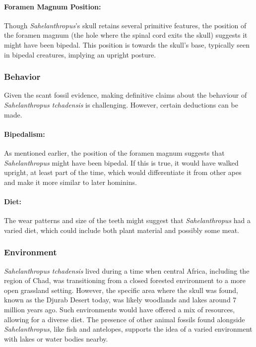 \paragraph{Foramen Magnum Position:} Though \textit{Sahelanthropus}'s skull retains several primitive features, the position of the foramen magnum (the hole where the spinal cord exits the skull) suggests it might have been bipedal. This position is towards the skull's base, typically seen in bipedal creatures, implying an upright posture.

\subsubsection*{Behavior}
Given the scant fossil evidence, making definitive claims about the behaviour of \textit{Sahelanthropus tchadensis} is challenging. However, certain deductions can be made.

\paragraph{Bipedalism:} As mentioned earlier, the position of the foramen magnum suggests that \textit{Sahelanthropus} might have been bipedal. If this is true, it would have walked upright, at least part of the time, which would differentiate it from other apes and make it more similar to later hominins.

\paragraph{Diet:} The wear patterns and size of the teeth might suggest that \textit{Sahelanthropus} had a varied diet, which could include both plant material and possibly some meat.

\subsubsection*{Environment}
\textit{Sahelanthropus tchadensis} lived during a time when central Africa, including the region of Chad, was transitioning from a closed forested environment to a more open grassland setting. However, the specific area where the skull was found, known as the Djurab Desert today, was likely woodlands and lakes around 7 million years ago. Such environments would have offered a mix of resources, allowing for a diverse diet. The presence of other animal fossils found alongside \textit{Sahelanthropus}, like fish and antelopes, supports the idea of a varied environment with lakes or water bodies nearby.

